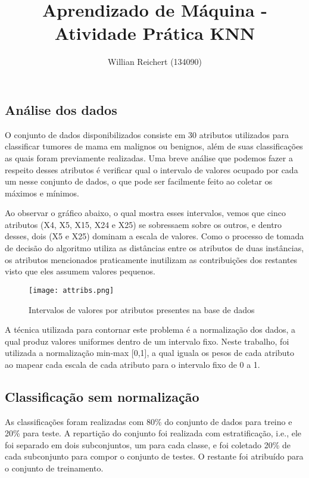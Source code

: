 \documentclass{article}
\title{Aprendizado de Máquina - Atividade Prática KNN}
\author{Willian Reichert (134090)}
\date{}
\begin{document}
\maketitle

\subsection*{Análise dos dados}

O conjunto de dados disponibilizados consiste em 30 atributos utilizados para classificar tumores de mama em malignos ou benignos, além de suas classificações as quais foram previamente realizadas. Uma breve análise que podemos fazer a respeito desses atributos é verificar qual o intervalo de valores ocupado por cada um nesse conjunto de dados, o que pode ser facilmente feito ao coletar os máximos e mínimos.

Ao observar o gráfico abaixo, o qual mostra esses intervalos, vemos que cinco atributos (X4, X5, X15, X24 e X25) se sobressaem sobre os outros, e dentro desses, dois (X5 e X25) dominam a escala de valores. Como o processo de tomada de decisão do algoritmo utiliza as distâncias entre os atributos de duas instâncias, os atributos mencionados praticamente inutilizam as contribuições dos restantes visto que eles assumem valores pequenos.

\begin{figure}[h]
    \texttt{[image: attribs.png]}
    \caption{Intervalos de valores por atributos presentes na base de dados}
    \centering
\end{figure}

A técnica utilizada para contornar este problema é a normalização dos dados, a qual produz valores uniformes dentro de um intervalo fixo. Neste trabalho, foi utilizada a normalização min-max [0,1], a qual iguala os pesos de cada atributo ao mapear cada escala de cada atributo para o intervalo fixo de 0 a 1.

\subsection*{Classificação sem normalização}

As classificações foram realizadas com 80\% do conjunto de dados para treino e 20\% para teste. A repartição do conjunto foi realizada com estratificação, i.e., ele foi separado em dois subconjuntos, um para cada classe, e foi coletado 20\% de cada subconjunto para compor o conjunto de testes. O restante foi atribuído para o conjunto de treinamento.
\end{document}
